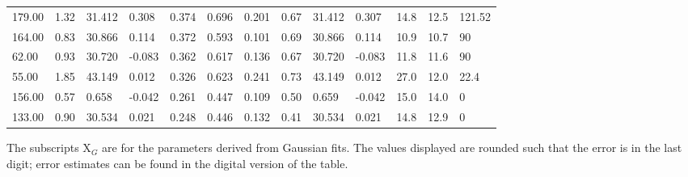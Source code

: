 \begin{table}[htp]
{\begin{tabular}{lllllllllllll}
179.00 & 1.32 & 31.412 & 0.308 & 0.374 & 0.696 & 0.201 & 0.67 & 31.412 & 0.307 & 14.8 & 12.5 & 121.52 \\
164.00 & 0.83 & 30.866 & 0.114 & 0.372 & 0.593 & 0.101 & 0.69 & 30.866 & 0.114 & 10.9 & 10.7 & 90 \\
62.00 & 0.93 & 30.720 & -0.083 & 0.362 & 0.617 & 0.136 & 0.67 & 30.720 & -0.083 & 11.8 & 11.6 & 90 \\
55.00 & 1.85 & 43.149 & 0.012 & 0.326 & 0.623 & 0.241 & 0.73 & 43.149 & 0.012 & 27.0 & 12.0 & 22.4 \\
156.00 & 0.57 & 0.658 & -0.042 & 0.261 & 0.447 & 0.109 & 0.50 & 0.659 & -0.042 & 15.0 & 14.0 & 0 \\
133.00 & 0.90 & 30.534 & 0.021 & 0.248 & 0.446 & 0.132 & 0.41 & 30.534 & 0.021 & 14.8 & 12.9 & 0 \\
\hline
\end{tabular}
}\par
The subscripts X${_G}$ are for the parameters derived from Gaussian fits.  The values displayed are rounded such that the error is in the last digit; error estimates can be found in the digital version of the table.
\end{table}

